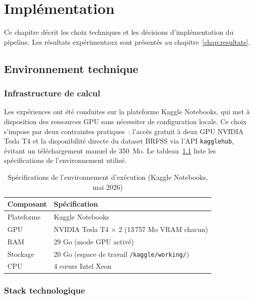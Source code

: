 \chapter{Implémentation}
\label{chap:implementation}

Ce chapitre décrit les choix techniques et les décisions d'implémentation du pipeline.
Les résultats expérimentaux sont présentés au chapitre~\ref{chap:resultats}.

\section{Environnement technique}

\subsection{Infrastructure de calcul}

Les expériences ont été conduites sur la plateforme Kaggle Notebooks, qui met à
disposition des ressources GPU sans nécessiter de configuration locale. Ce choix
s'impose par deux contraintes pratiques~: l'accès gratuit à deux GPU NVIDIA Tesla T4
et la disponibilité directe du dataset BRFSS via l'API \texttt{kagglehub}, évitant
un téléchargement manuel de 350~Mo. Le tableau~\ref{tab:env} liste les spécifications
de l'environnement utilisé.

\begin{table}[H]
\centering
\caption{Spécifications de l'environnement d'exécution (Kaggle Notebooks, mai 2026)}
\label{tab:env}
\begin{tabular}{ll}
\toprule
\textbf{Composant} & \textbf{Spécification} \\
\midrule
Plateforme  & Kaggle Notebooks \\
GPU         & NVIDIA Tesla T4 $\times$ 2 (13\,757 Mo VRAM chacun) \\
RAM         & 29 Go (mode GPU activé) \\
Stockage    & 20 Go (espace de travail \texttt{/kaggle/working/}) \\
CPU         & 4 cœurs Intel Xeon \\
\bottomrule
\end{tabular}
\end{table}

\subsection{Stack technologique}

